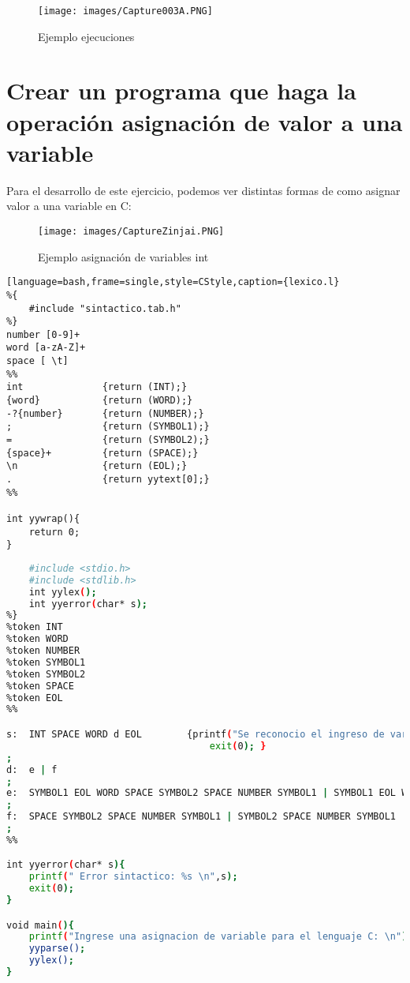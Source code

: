 \documentclass[12pt]{article}
\begin{document}
\clearpage
\newpage

\begin{figure}[h]
    \centering
    \texttt{[image: images/Capture003A.PNG]}
    \caption{Ejemplo ejecuciones}
\end{figure}

\section{Crear un programa que haga la operación asignación de valor a una variable}

Para el desarrollo de este ejercicio, podemos ver distintas formas de como asignar valor a una variable en C:

\begin{figure}[h]
    \centering
    \texttt{[image: images/CaptureZinjai.PNG]}
    \caption{Ejemplo asignación de variables int}
\end{figure}


\clearpage
\newpage

\begin{lstlisting}[language=bash,frame=single,style=CStyle,caption={lexico.l}
%{
    #include "sintactico.tab.h"
%}
number [0-9]+
word [a-zA-Z]+
space [ \t]
%%
int              {return (INT);}
{word}           {return (WORD);}
-?{number}       {return (NUMBER);}
;                {return (SYMBOL1);}
=                {return (SYMBOL2);}
{space}+         {return (SPACE);}  
\n               {return (EOL);}
.                {return yytext[0];}
%%

int yywrap(){
    return 0;
}
\end{lstlisting}

\begin{lstlisting}[language=bash,frame=single,style=CStyle,caption={sintactico.y}]
%{
    #include <stdio.h>
    #include <stdlib.h>
    int yylex();
    int yyerror(char* s);
%}
%token INT 
%token WORD
%token NUMBER
%token SYMBOL1
%token SYMBOL2
%token SPACE
%token EOL
%%

s:  INT SPACE WORD d EOL        {printf("Se reconocio el ingreso de variable entera\n");
                                    exit(0); }
;
d:  e | f 
;
e:  SYMBOL1 EOL WORD SPACE SYMBOL2 SPACE NUMBER SYMBOL1 | SYMBOL1 EOL WORD SYMBOL2 NUMBER SYMBOL1 | SYMBOL1 EOL WORD SYMBOL2 SPACE NUMBER SYMBOL1 | SYMBOL1 EOL WORD SPACE SYMBOL2 NUMBER SYMBOL1  
;
f:  SPACE SYMBOL2 SPACE NUMBER SYMBOL1 | SYMBOL2 SPACE NUMBER SYMBOL1 | SPACE SYMBOL2 NUMBER SYMBOL1 | SYMBOL2 NUMBER SYMBOL1
;
%%

int yyerror(char* s){
    printf(" Error sintactico: %s \n",s);
    exit(0);
}

void main(){
    printf("Ingrese una asignacion de variable para el lenguaje C: \n");
    yyparse();
    yylex();
}
\end{lstlisting}
\end{document}
